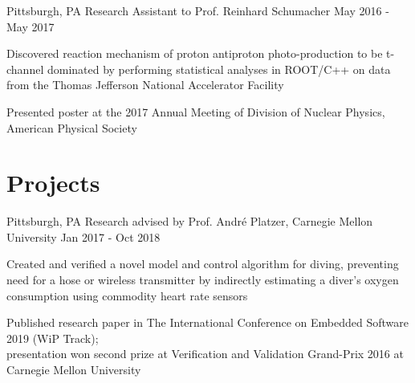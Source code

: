 \documentclass[11pt, letterpaper]{simple_resume}[2020/07/29]
\begin{document}

                {Pittsburgh, PA} %
                {Research Assistant to Prof. Reinhard Schumacher} %
                {May 2016 - May 2017} %
{\begin{items}
    \item {Discovered reaction mechanism of proton antiproton photo-production to be t-channel dominated by performing statistical analyses in ROOT/C++ on data from the Thomas Jefferson National Accelerator Facility}
    \item {Presented poster at the 2017 Annual Meeting of Division of Nuclear Physics, American Physical Society}
\end{items}}

\section{Projects}
                {Pittsburgh, PA} %
                {Research advised by Prof. André Platzer, Carnegie Mellon University} %
                {Jan 2017 - Oct 2018} %
{\begin{items}
    \item{Created and verified a novel model and control algorithm for diving, preventing need for a hose or wireless transmitter by indirectly estimating a diver’s oxygen consumption using commodity heart rate sensors}
    \item {Published research paper in The International Conference on Embedded Software 2019 (WiP Track);\\ presentation won second prize at Verification and Validation Grand-Prix 2016 at Carnegie Mellon University}
\end{items}}
\end{document}
